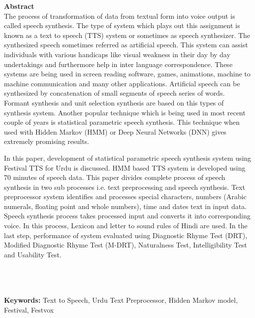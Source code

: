 
{\LARGE\textbf {Abstract}} \\ %
The process of transformation of data from textual form into voice output is called speech synthesis. The type of system which plays out this assignment is known as a text to speech (TTS) system or sometimes as speech synthesizer. The synthesized speech sometimes referred as artificial speech. This system can assist individuals with various handicaps like visual weakness in their day by day undertakings and furthermore help in inter language correspondence. These systems are being used in screen reading software, games, animations, machine to machine communication and many other applications. Artificial speech can be synthesized by concatenation of small segments of speech series of words. Formant synthesis and unit selection synthesis are based on this types of synthesis system. Another popular technique which is being used in most recent couple of years is statistical parametric speech synthesis. This technique when used with Hidden Markov (HMM) or Deep Neural Networks (DNN) gives extremely promising results.

In this paper, development of statistical parametric speech synthesis system using Festival TTS for Urdu is discussed. HMM based TTS system is developed using 70 minutes of speech data. This paper divides complete process of speech synthesis in two sub processes i.e. text preprocessing and speech synthesis. Text preprocessor system identifies and processes special characters, numbers (Arabic numerals, floating point and whole numbers), time and dates text in input data. Speech synthesis process takes processed input and converts it into corresponding voice. In this process, Lexicon and letter to sound rules of Hindi are used. In the last step, performance of system evaluated using Diagnostic Rhyme Test (DRT), Modified Diagnostic Rhyme Test (M-DRT), Naturalness Test, Intelligibility Test and Usability Test.


\\ \\ \\
\textbf{Keywords:}
Text to Speech, Urdu Text Preprocessor, Hidden Markov model, Festival, Festvox
